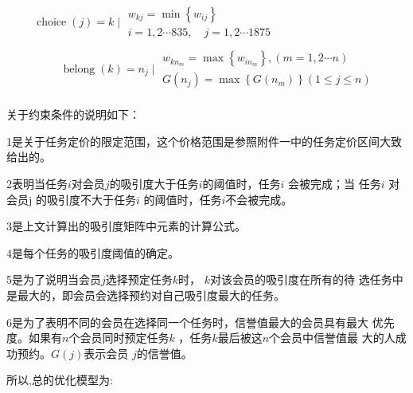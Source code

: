 \begin{enumerate}
$$\begin{array}{c}
                  \operatorname{choice}(j)=k \mid \begin{array}{c}
                      w_{kj}=\min \left\{w_{i j}\right\} \\
                      i=1,2 \cdots 835, \quad j=1,2 \cdots 1875
                  \end{array}     \\
                  \begin{array}{c}
                      \qquad \operatorname{belong}(k)=n_{j} \mid \begin{array}{l}
                          w_{k n_{m}}=\max \left\{w_{i n_{m}}\right\},(m=1,2 \cdots n) \\
                          G\left(n_{j}\right)=\max \left\{G\left(n_{m}\right)\right\}(1 \leq j \leq n)
                      \end{array}
                  \end{array}
              \end{array}
          $$
\end{enumerate}

关于约束条件的说明如下：

1是关于任务定价的限定范围，这个价格范围是参照附件一中的任务定价区间大致给出的。

2表明当任务$i $对会员$j $的吸引度大于任务$i $的阈值时，任务$i$ 会被完成；当
任务$i$ 对会员j 的吸引度不大于任务$i$  的阈值时，任务$i$不会被完成。

3是上文计算出的吸引度矩阵中元素的计算公式。

4是每个任务的吸引度阈值的确定。

5是为了说明当会员$j $选择预定任务$k $时， $k $对该会员的吸引度在所有的待
选任务中是最大的，即会员会选择预约对自己吸引度最大的任务。

6是为了表明不同的会员在选择同一个任务时，信誉值最大的会员具有最大
优先度。如果有$n $个会员同时预定任务$k$ ，任务$k $最后被这$n $个会员中信誉值最
大的人成功预约。$G( j)$表示会员 $j$的信誉值。

所以,总的优化模型为:


